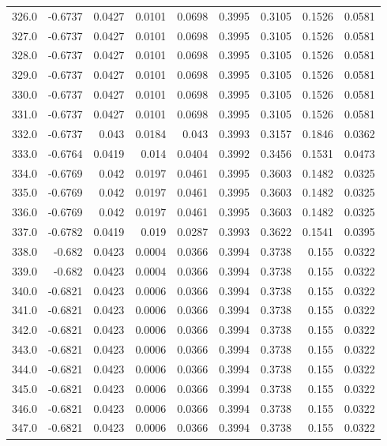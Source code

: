 \begin{longtable}{lrrrrrrrr}
326.0 & -0.6737 & 0.0427 & 0.0101 & 0.0698 & 0.3995 & 0.3105 & 0.1526 & 0.0581 \\
327.0 & -0.6737 & 0.0427 & 0.0101 & 0.0698 & 0.3995 & 0.3105 & 0.1526 & 0.0581 \\
328.0 & -0.6737 & 0.0427 & 0.0101 & 0.0698 & 0.3995 & 0.3105 & 0.1526 & 0.0581 \\
329.0 & -0.6737 & 0.0427 & 0.0101 & 0.0698 & 0.3995 & 0.3105 & 0.1526 & 0.0581 \\
330.0 & -0.6737 & 0.0427 & 0.0101 & 0.0698 & 0.3995 & 0.3105 & 0.1526 & 0.0581 \\
331.0 & -0.6737 & 0.0427 & 0.0101 & 0.0698 & 0.3995 & 0.3105 & 0.1526 & 0.0581 \\
332.0 & -0.6737 & 0.043 & 0.0184 & 0.043 & 0.3993 & 0.3157 & 0.1846 & 0.0362 \\
333.0 & -0.6764 & 0.0419 & 0.014 & 0.0404 & 0.3992 & 0.3456 & 0.1531 & 0.0473 \\
334.0 & -0.6769 & 0.042 & 0.0197 & 0.0461 & 0.3995 & 0.3603 & 0.1482 & 0.0325 \\
335.0 & -0.6769 & 0.042 & 0.0197 & 0.0461 & 0.3995 & 0.3603 & 0.1482 & 0.0325 \\
336.0 & -0.6769 & 0.042 & 0.0197 & 0.0461 & 0.3995 & 0.3603 & 0.1482 & 0.0325 \\
337.0 & -0.6782 & 0.0419 & 0.019 & 0.0287 & 0.3993 & 0.3622 & 0.1541 & 0.0395 \\
338.0 & -0.682 & 0.0423 & 0.0004 & 0.0366 & 0.3994 & 0.3738 & 0.155 & 0.0322 \\
339.0 & -0.682 & 0.0423 & 0.0004 & 0.0366 & 0.3994 & 0.3738 & 0.155 & 0.0322 \\
340.0 & -0.6821 & 0.0423 & 0.0006 & 0.0366 & 0.3994 & 0.3738 & 0.155 & 0.0322 \\
341.0 & -0.6821 & 0.0423 & 0.0006 & 0.0366 & 0.3994 & 0.3738 & 0.155 & 0.0322 \\
342.0 & -0.6821 & 0.0423 & 0.0006 & 0.0366 & 0.3994 & 0.3738 & 0.155 & 0.0322 \\
343.0 & -0.6821 & 0.0423 & 0.0006 & 0.0366 & 0.3994 & 0.3738 & 0.155 & 0.0322 \\
344.0 & -0.6821 & 0.0423 & 0.0006 & 0.0366 & 0.3994 & 0.3738 & 0.155 & 0.0322 \\
345.0 & -0.6821 & 0.0423 & 0.0006 & 0.0366 & 0.3994 & 0.3738 & 0.155 & 0.0322 \\
346.0 & -0.6821 & 0.0423 & 0.0006 & 0.0366 & 0.3994 & 0.3738 & 0.155 & 0.0322 \\
347.0 & -0.6821 & 0.0423 & 0.0006 & 0.0366 & 0.3994 & 0.3738 & 0.155 & 0.0322 \\

\end{longtable}

